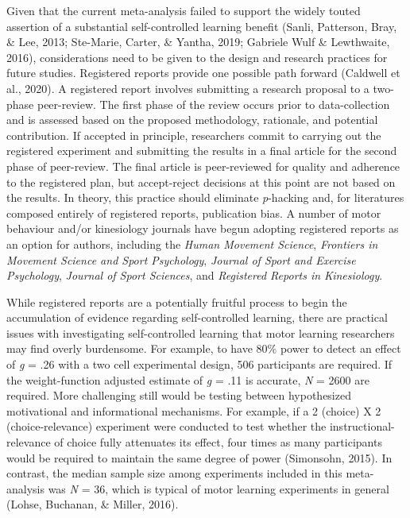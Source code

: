 \documentclass[
  english,
  man,floatsintext]{apa7}
\begin{document}
Given that the current meta-analysis failed to support the widely touted assertion of a substantial self-controlled learning benefit (Sanli, Patterson, Bray, \& Lee, 2013; Ste-Marie, Carter, \& Yantha, 2019; Gabriele Wulf \& Lewthwaite, 2016), considerations need to be given to the design and research practices for future studies. Registered reports provide one possible path forward (Caldwell et al., 2020). A registered report involves submitting a research proposal to a two-phase peer-review. The first phase of the review occurs prior to data-collection and is assessed based on the proposed methodology, rationale, and potential contribution. If accepted in principle, researchers commit to carrying out the registered experiment and submitting the results in a final article for the second phase of peer-review. The final article is peer-reviewed for quality and adherence to the registered plan, but accept-reject decisions at this point are not based on the results. In theory, this practice should eliminate \emph{p}-hacking and, for literatures composed entirely of registered reports, publication bias. A number of motor behaviour and/or kinesiology journals have begun adopting registered reports as an option for authors, including the \emph{Human Movement Science}, \emph{Frontiers in Movement Science and Sport Psychology}, \emph{Journal of Sport and Exercise Psychology}, \emph{Journal of Sport Sciences}, and \emph{Registered Reports in Kinesiology}.

While registered reports are a potentially fruitful process to begin the accumulation of evidence regarding self-controlled learning, there are practical issues with investigating self-controlled learning that motor learning researchers may find overly burdensome. For example, to have 80\% power to detect an effect of \emph{g} = .26 with a two cell experimental design, 506 participants are required. If the weight-function adjusted estimate of \emph{g} = .11 is accurate, \emph{N} = 2600 are required. More challenging still would be testing between hypothesized motivational and informational mechanisms. For example, if a 2 (choice) X 2 (choice-relevance) experiment were conducted to test whether the instructional-relevance of choice fully attenuates its effect, four times as many participants would be required to maintain the same degree of power (Simonsohn, 2015). In contrast, the median sample size among experiments included in this meta-analysis was \emph{N} = 36, which is typical of motor learning experiments in general (Lohse, Buchanan, \& Miller, 2016).
\end{document}
